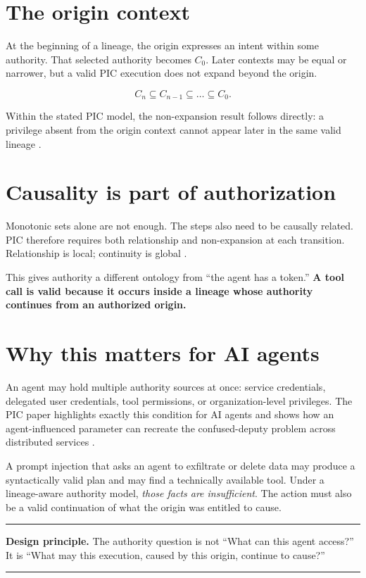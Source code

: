 \documentclass[10pt,oneside,openany]{book}
\newcommand{\principle}[1]{%
  \vspace{4pt}
  \noindent\begin{minipage}{\linewidth}
  \hrule\vspace{5pt}
  \small\sffamily\raggedright\textbf{Design principle.} #1
  \vspace{5pt}\hrule
  \end{minipage}\vspace{4pt}
}
\begin{document}
\section{The origin context}
At the beginning of a lineage, the origin expresses an intent within some authority. That selected authority becomes \(C_0\). Later contexts may be equal or narrower, but a valid PIC execution does not expand beyond the origin.
\begin{formulabox}
\[
C_n \subseteq C_{n-1} \subseteq \dots \subseteq C_0.
\]
\end{formulabox}
Within the stated PIC model, the non-expansion result follows directly: a privilege absent from the origin context cannot appear later in the same valid lineage \cite{gallo2026pic}.

\section{Causality is part of authorization}
Monotonic sets alone are not enough. The steps also need to be causally related. PIC therefore requires both relationship and non-expansion at each transition. Relationship is local; continuity is global \cite{gallo2026pic}.

This gives authority a different ontology from ``the agent has a token.'' \textbf{A tool call is valid because it occurs inside a lineage whose authority continues from an authorized origin.}

\section{Why this matters for AI agents}
An agent may hold multiple authority sources at once: service credentials, delegated user credentials, tool permissions, or organization-level privileges. The PIC paper highlights exactly this condition for AI agents and shows how an agent-influenced parameter can recreate the confused-deputy problem across distributed services \cite{gallo2026pic}.

A prompt injection that asks an agent to exfiltrate or delete data may produce a syntactically valid plan and may find a technically available tool. Under a lineage-aware authority model, \emph{those facts are insufficient}. The action must also be a valid continuation of what the origin was entitled to cause.

\principle{The authority question is not ``What can this agent access?'' It is ``What may this execution, caused by this origin, continue to cause?''}
\end{document}
